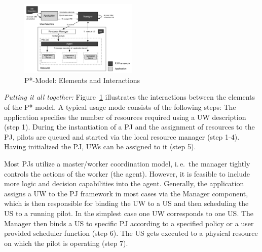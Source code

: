 \documentclass[conference,final]{IEEEtran}
\newcommand{\jhanote}[1]{ {\textcolor{red} { ***shantenu: #1 }}}
\newcommand{\jhanote}[1]{}
\newcommand{\upp}{\vspace*{-0.5em}}
\begin{document}

 

\begin{figure}[htbp]
    \centering    
    \includegraphics[width=0.5\textwidth]{figures/pstar_model.pdf}
    \caption{P*-Model: Elements and Interactions\upp}
    \label{fig:figures_pstar}
\end{figure}

{\it Putting it all together:} Figure~\ref{fig:figures_pstar} illustrates the
interactions between the elements of the P* model. A typical usage mode consists
of the following steps: The application specifies the number of resources
required using a UW description (step 1). During the instantiation of a PJ and
the assignment of resources to the PJ, pilots are queued and started via the
local resource manager (step 1-4). Having initialized the PJ, UWs can be
assigned to it (step 5).


Most PJs utilize a master/worker coordination model, i.\,e.\ the
manager tightly controls the actions of the worker (the
agent). However, it is feasible to include more logic and decision
capabilities into the agent. Generally, the application assigns a UW
to the PJ framework in most cases via the Manager component, which is
then responsible for binding the UW to a US and then scheduling the US 
to a running pilot.  In
the simplest case one UW corresponds to one US. The Manager then binds
a US to specific PJ according to a specified policy or a user provided
scheduler function (step 6). The US gets executed to a physical
resource on which the pilot is operating (step 7).
\end{document}
